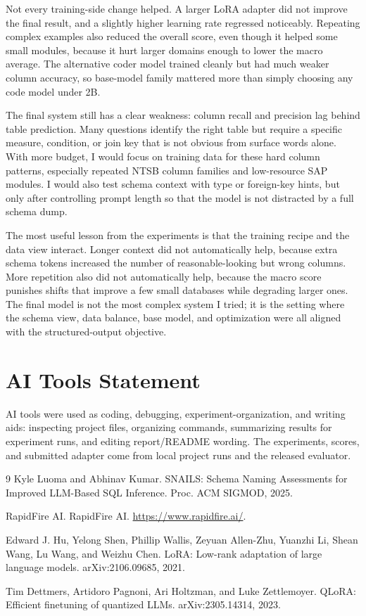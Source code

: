 \documentclass{article}
\begin{document}
Not every training-side change helped. A larger LoRA adapter did not improve the final result, and
a slightly higher learning rate regressed noticeably. Repeating complex examples also reduced the
overall score, even though it helped some small modules, because it hurt larger domains enough to
lower the macro average. The alternative coder model trained cleanly but had much weaker column
accuracy, so base-model family mattered more than simply choosing any code model under 2B.

The final system still has a clear weakness: column recall and precision lag behind table prediction.
Many questions identify the right table but require a specific measure, condition, or join key that is
not obvious from surface words alone. With more budget, I would focus on training data for these
hard column patterns, especially repeated NTSB column families and low-resource SAP modules. I
would also test schema context with type or foreign-key hints, but only after controlling prompt length
so that the model is not distracted by a full schema dump.

The most useful lesson from the experiments is that the training recipe and the data view interact.
Longer context did not automatically help, because extra schema tokens increased the number of
reasonable-looking but wrong columns. More repetition also did not automatically help, because the
macro score punishes shifts that improve a few small databases while degrading larger ones. The final
model is not the most complex system I tried; it is the setting where the schema view, data balance,
base model, and optimization were all aligned with the structured-output objective.

\section{AI Tools Statement}

AI tools were used as coding, debugging, experiment-organization, and writing aids: inspecting
project files, organizing commands, summarizing results for experiment runs, and editing
report/README wording. The experiments, scores, and submitted adapter come from local project
runs and the released evaluator.

\begin{thebibliography}{9}
Kyle Luoma and Abhinav Kumar.
\newblock SNAILS: Schema Naming Assessments for Improved LLM-Based SQL Inference.
\newblock Proc. ACM SIGMOD, 2025.

RapidFire AI.
\newblock RapidFire AI.
\newblock \url{https://www.rapidfire.ai/}.

Edward J. Hu, Yelong Shen, Phillip Wallis, Zeyuan Allen-Zhu, Yuanzhi Li, Shean Wang, Lu Wang, and Weizhu Chen.
\newblock LoRA: Low-rank adaptation of large language models.
\newblock arXiv:2106.09685, 2021.

Tim Dettmers, Artidoro Pagnoni, Ari Holtzman, and Luke Zettlemoyer.
\newblock QLoRA: Efficient finetuning of quantized LLMs.
\newblock arXiv:2305.14314, 2023.

\end{thebibliography}
\end{document}
